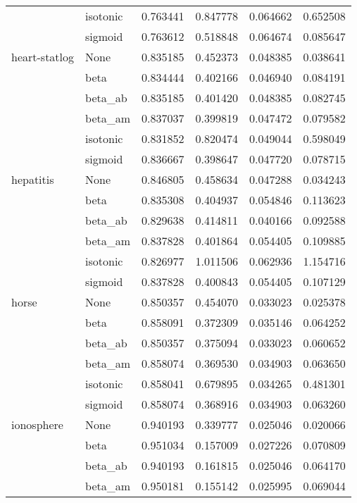 \begin{tabular}{llrrrr}
        & isotonic &  0.763441 &  0.847778 &  0.064662 &  0.652508 \\
        & sigmoid &  0.763612 &  0.518848 &  0.064674 &  0.085647 \\
heart-statlog & None &  0.835185 &  0.452373 &  0.048385 &  0.038641 \\
        & beta &  0.834444 &  0.402166 &  0.046940 &  0.084191 \\
        & beta\_ab &  0.835185 &  0.401420 &  0.048385 &  0.082745 \\
        & beta\_am &  0.837037 &  0.399819 &  0.047472 &  0.079582 \\
        & isotonic &  0.831852 &  0.820474 &  0.049044 &  0.598049 \\
        & sigmoid &  0.836667 &  0.398647 &  0.047720 &  0.078715 \\
hepatitis & None &  0.846805 &  0.458634 &  0.047288 &  0.034243 \\
        & beta &  0.835308 &  0.404937 &  0.054846 &  0.113623 \\
        & beta\_ab &  0.829638 &  0.414811 &  0.040166 &  0.092588 \\
        & beta\_am &  0.837828 &  0.401864 &  0.054405 &  0.109885 \\
        & isotonic &  0.826977 &  1.011506 &  0.062936 &  1.154716 \\
        & sigmoid &  0.837828 &  0.400843 &  0.054405 &  0.107129 \\
horse & None &  0.850357 &  0.454070 &  0.033023 &  0.025378 \\
        & beta &  0.858091 &  0.372309 &  0.035146 &  0.064252 \\
        & beta\_ab &  0.850357 &  0.375094 &  0.033023 &  0.060652 \\
        & beta\_am &  0.858074 &  0.369530 &  0.034903 &  0.063650 \\
        & isotonic &  0.858041 &  0.679895 &  0.034265 &  0.481301 \\
        & sigmoid &  0.858074 &  0.368916 &  0.034903 &  0.063260 \\
ionosphere & None &  0.940193 &  0.339777 &  0.025046 &  0.020066 \\
        & beta &  0.951034 &  0.157009 &  0.027226 &  0.070809 \\
        & beta\_ab &  0.940193 &  0.161815 &  0.025046 &  0.064170 \\
        & beta\_am &  0.950181 &  0.155142 &  0.025995 &  0.069044 \\

\end{tabular}
